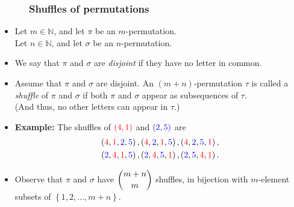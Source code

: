 \documentclass{beamer}
\newcommand{\red}{\color{red}}
\newcommand{\blue}{\color{blue}}
\newcommand{\NN}{{\mathbb N}}
\newcommand{\fti}[1]{\frametitle{\ \ \ \ \ #1}}
\newcommand{\set}[1]{\left\{ #1 \right\}}
\newcommand{\tup}[1]{\left( #1 \right)}
\newcommand{\defn}[1]{{\color{darkred}\emph{#1}}} %
\theoremstyle{plain}
\begin{document}
\begin{frame}
\fti{Shuffles of permutations}

\begin{itemize}

\item Let $m \in \NN$, and let $\pi$ be an $m$-permutation. \\
      Let $n \in \NN$, and let $\sigma$ be an $n$-permutation.

\item We say that $\pi$ and $\sigma$ are \defn{disjoint} if they have
      no letter in common.

\pause

\item Assume that $\pi$ and $\sigma$ are disjoint.
      An $\tup{m+n}$-permutation $\tau$ is called a \defn{shuffle} of
      $\pi$ and $\sigma$ if both $\pi$ and $\sigma$ appear as
      subsequences of $\tau$. \\
      (And thus, no other letters can appear in $\tau$.)

\item \textbf{Example:}
      The shuffles of ${\red \tup{4, 1}}$ and ${\blue \tup{2, 5}}$
      are
      \begin{align*}
      &     \tup{ {\red 4}, {\red 1}, {\blue 2}, {\blue 5} } ,
            \tup{ {\red 4}, {\blue 2}, {\red 1}, {\blue 5} } ,
            \tup{ {\red 4}, {\blue 2}, {\blue 5}, {\red 1} } , \\
      &
            \tup{ {\blue 2}, {\red 4}, {\red 1}, {\blue 5} } ,
            \tup{ {\blue 2}, {\red 4}, {\blue 5}, {\red 1} } ,
            \tup{ {\blue 2}, {\blue 5}, {\red 4}, {\red 1} } .
      \end{align*}

\pause

\item Observe that $\pi$ and $\sigma$ have $\dbinom{m+n}{m}$
      shuffles, in bijection with $m$-element subsets of
      $\set{1, 2, \ldots, m+n}$.

\end{itemize}
\end{frame}
\end{document}
